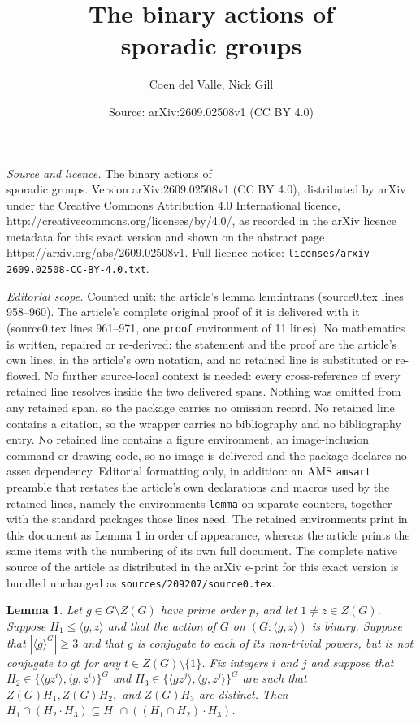 \documentclass[10pt,a4paper]{amsart}
\title{The binary actions of\\ sporadic groups}
\author{Coen del Valle, Nick Gill}
\date{Source: arXiv:2609.02508v1 (CC BY 4.0)}
\newtheorem{lemma}{Lemma}
\begin{document}
\maketitle

\noindent\emph{Source and licence.} The binary actions of\\ sporadic groups. Version arXiv:2609.02508v1 (CC BY 4.0), distributed by arXiv under the Creative Commons Attribution 4.0 International licence, http://creativecommons.org/licenses/by/4.0/, as recorded in the arXiv licence metadata for this exact version and shown on the abstract page https://arxiv.org/abs/2609.02508v1. Full licence notice: \texttt{licenses/arxiv-2609.02508-CC-BY-4.0.txt}.\par\smallskip

\noindent\textit{Editorial scope.} Counted unit: the article's lemma lem:intrans (source0.tex lines 958--960). The article's complete original proof of it is delivered with it (source0.tex lines 961--971, one \texttt{proof} environment of 11 lines). No mathematics is written, repaired or re-derived: the statement and the proof are the article's own lines, in the article's own notation, and no retained line is substituted or re-flowed.  No further source-local context is needed: every cross-reference of every retained line resolves inside the two delivered spans.  Nothing was omitted from any retained span, so the package carries no omission record.  No retained line contains a citation, so the wrapper carries no bibliography and no bibliography entry.  No retained line contains a figure environment, an image-inclusion command or drawing code, so no image is delivered and the package declares no asset dependency.  Editorial formatting only, in addition: an AMS \texttt{amsart} preamble that restates the article's own declarations and macros used by the retained lines, namely the environments \texttt{lemma} on separate counters, together with the standard packages those lines need.  The retained environments print in this document as Lemma 1 in order of appearance, whereas the article prints the same items with the numbering of its own full document.  The complete native source of the article as distributed in the arXiv e-print for this exact version is bundled unchanged as \texttt{sources/209207/source0.tex}.
\begin{lemma}\label{lem:intrans}
    Let $g\in G\setminus Z(G)$ have prime order $p$, and let $1\ne z\in Z(G)$.     Suppose $H_1\leq \langle g,z\rangle$ and that the action of $G$ on $(G:\langle g,z\rangle)$ is binary.     Suppose that $|\langle g\rangle^G|\geq 3$ and that $g$ is conjugate to each of its non-trivial powers, but is not conjugate to $gt$ for any $t\in Z(G)\setminus \{1\}$. Fix integers $i$ and $j$ and suppose that $H_2\in\{\langle gz^i\rangle,\langle g,z^i\rangle\}^G$ and $H_3\in \{\langle gz^j\rangle,\langle g,z^j\rangle\}^G$ are such that $Z(G)H_1, Z(G)H_2,$ and $Z(G)H_3$ are distinct. Then $H_1\cap (H_2\cdot H_3)\subseteq H_1\cap((H_1\cap H_2)\cdot H_3)$.
\end{lemma}
\end{document}
